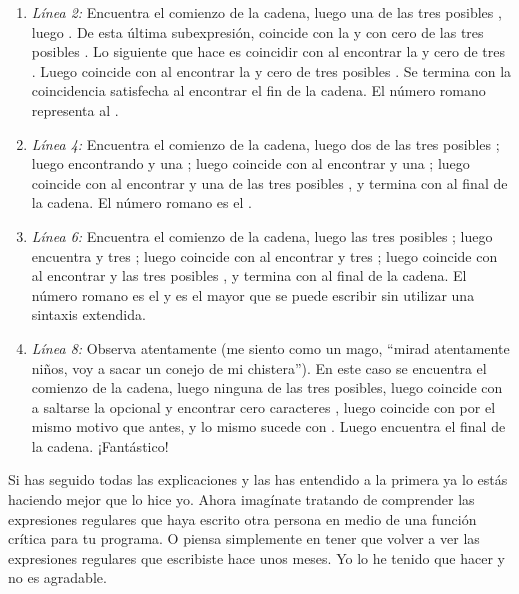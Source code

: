 \begin{enumerate}

\item \emph{Línea 2:} Encuentra el comienzo de la cadena, luego una de las tres posibles , luego . De esta última subexpresión, coincide con la  y con cero de las tres posibles . Lo siguiente que hace es coincidir con  al encontrar la  y cero de tres . Luego coincide con  al encontrar la  y cero de tres posibles . Se termina con la coincidencia satisfecha al encontrar el fin de la cadena. El número romano  representa al .

\item \emph{Línea 4:} Encuentra el comienzo de la cadena, luego dos de las tres posibles ; luego  encontrando  y una ; luego coincide con  al encontrar  y una ; luego coincide con  al encontrar  y una de las tres posibles , y termina con al final de la cadena. El número romano  es el .

\item \emph{Línea 6:} Encuentra el comienzo de la cadena, luego las tres posibles ; luego  encuentra  y tres ; luego coincide con  al encontrar  y tres ; luego coincide con  al encontrar  y las tres posibles , y termina con al final de la cadena. El número romano  es el  y es el mayor que se puede escribir sin utilizar una sintaxis extendida.

\item \emph{Línea 8:} Observa atentamente (me siento como un mago, ``mirad atentamente niños, voy a sacar un conejo de mi chistera''). En este caso se encuentra el comienzo de la cadena, luego ninguna  de las tres posibles, luego coincide con  a saltarse la  opcional y encontrar cero caracteres , luego coincide con  por el mismo motivo que antes, y lo mismo sucede con . Luego encuentra el final de la cadena. ¡Fantástico!

\end{enumerate}

Si has seguido todas las explicaciones y las has entendido a la primera ya lo estás haciendo mejor que lo hice yo. Ahora imagínate tratando de comprender las expresiones regulares que haya escrito otra persona en medio de una función crítica para tu programa. O piensa simplemente en tener que volver a ver las expresiones regulares que escribiste hace unos meses. Yo lo he tenido que hacer y no es agradable.


